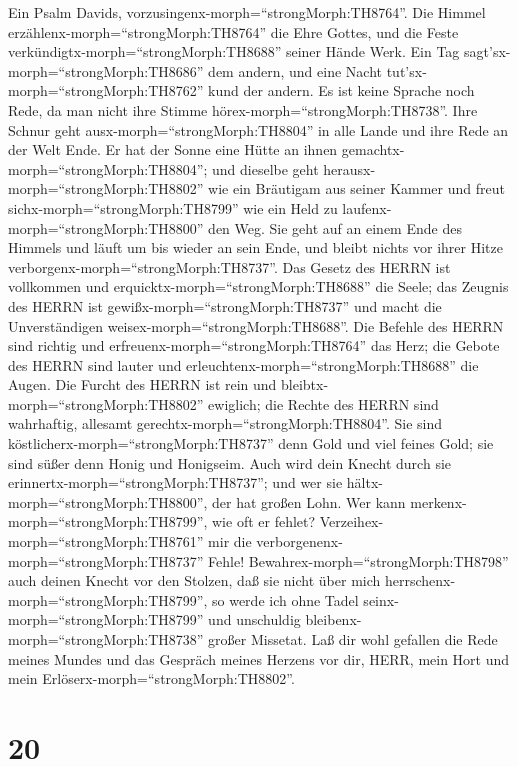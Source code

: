  Ein Psalm Davids,
vorzusingenx-morph=``strongMorph:TH8764''. Die Himmel
erzählenx-morph=``strongMorph:TH8764'' die Ehre Gottes, und die Feste
verkündigtx-morph=``strongMorph:TH8688'' seiner Hände Werk. 
Ein Tag sagt'sx-morph=``strongMorph:TH8686'' dem andern, und eine Nacht
tut'sx-morph=``strongMorph:TH8762'' kund der andern.  Es ist
keine Sprache noch Rede, da man nicht ihre Stimme
hörex-morph=``strongMorph:TH8738''.  Ihre Schnur geht
ausx-morph=``strongMorph:TH8804'' in alle Lande und ihre Rede an der
Welt Ende. Er hat der Sonne eine Hütte an ihnen
gemachtx-morph=``strongMorph:TH8804'';  und dieselbe geht
herausx-morph=``strongMorph:TH8802'' wie ein Bräutigam aus seiner Kammer
und freut sichx-morph=``strongMorph:TH8799'' wie ein Held zu
laufenx-morph=``strongMorph:TH8800'' den Weg.  Sie geht auf
an einem Ende des Himmels und läuft um bis wieder an sein Ende, und
bleibt nichts vor ihrer Hitze verborgenx-morph=``strongMorph:TH8737''.
 Das Gesetz des HERRN ist vollkommen und
erquicktx-morph=``strongMorph:TH8688'' die Seele; das Zeugnis des HERRN
ist gewißx-morph=``strongMorph:TH8737'' und macht die Unverständigen
weisex-morph=``strongMorph:TH8688''.  Die Befehle des HERRN
sind richtig und erfreuenx-morph=``strongMorph:TH8764'' das Herz; die
Gebote des HERRN sind lauter und
erleuchtenx-morph=``strongMorph:TH8688'' die Augen.  Die
Furcht des HERRN ist rein und bleibtx-morph=``strongMorph:TH8802''
ewiglich; die Rechte des HERRN sind wahrhaftig, allesamt
gerechtx-morph=``strongMorph:TH8804''.  Sie sind
köstlicherx-morph=``strongMorph:TH8737'' denn Gold und viel feines Gold;
sie sind süßer denn Honig und Honigseim.  Auch wird dein
Knecht durch sie erinnertx-morph=``strongMorph:TH8737''; und wer sie
hältx-morph=``strongMorph:TH8800'', der hat großen Lohn. 
Wer kann merkenx-morph=``strongMorph:TH8799'', wie oft er fehlet?
Verzeihex-morph=``strongMorph:TH8761'' mir die
verborgenenx-morph=``strongMorph:TH8737'' Fehle! 
Bewahrex-morph=``strongMorph:TH8798'' auch deinen Knecht vor den
Stolzen, daß sie nicht über mich
herrschenx-morph=``strongMorph:TH8799'', so werde ich ohne Tadel
seinx-morph=``strongMorph:TH8799'' und unschuldig
bleibenx-morph=``strongMorph:TH8738'' großer Missetat.  Laß
dir wohl gefallen die Rede meines Mundes und das Gespräch meines Herzens
vor dir, HERR, mein Hort und mein Erlöserx-morph=``strongMorph:TH8802''.

\hypertarget{section-19}{%
\section{20}\label{section-19}}

